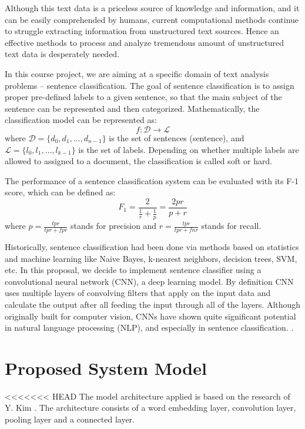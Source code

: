 \documentclass[conference]{IEEEtran}
\begin{document}
    Although this text data is a priceless source of knowledge and information,
    and it can be easily comprehended by humans, current computational methods
    continue to struggle extracting information from unstructured text sources\cite{mitchell2015}.
    Hence an effective methods to process and analyze tremendous
    amount of unstructured text data is desperately needed.
    
    In this course project, we are aiming at a specific domain of text analysis
    problems -- sentence classification. The goal of sentence classification is to assign
    proper pre-defined labels to a given sentence, so that the main subject of the 
    sentence can be represented and then categorized\cite{allahyari2017brief}. 
    Mathematically, the classification model can be represented as:
    $$f:\mathcal{D}\rightarrow\mathcal{L}$$
    where $\mathcal{D}=\{d_0, d_1,\ldots, d_{n-1}\}$ is the set of sentences
    (sentence), and $\mathcal{L}=\{l_0, l_1,\ldots, l_{k-1}\}$ is the set of labels.
    Depending on whether multiple labels are allowed to assigned to a document, the 
    classification is called soft or hard\cite{gopal2010multilabel}.
    
    The performance of a sentence classification system can be evaluated with its
    F-1 score, which can be defined as\cite{forman2003extensive}:
    $$F_1=\frac{2}{\frac{1}{r}+\frac{1}{p}}=\frac{2pr}{p+r}$$
    where $p=\frac{tpr}{tpr+fpr}$ stands for precision and $r=\frac{tpr}{tpr+fnr}$ 
    stands for recall.
    
    Historically, sentence classification had been done via methods based on 
    statistics and machine learning like Naive Bayes, k-nearest neighbors, decision 
    trees, SVM, etc. In this proposal, we decide to implement sentence classifier
    using a convolutional neural network (CNN), a deep learning model. By definition
    CNN uses multiple layers of convolving filters that apply on the input data and 
    calculate the output after all feeding the input through all of the layers. Although
    originally built for computer vision, CNNs have shown quite significant potential in 
    natural language processing (NLP), and especially in sentence classification.
    \cite{kim2014convolutional}. 

\section{Proposed System Model}
<<<<<<< HEAD
The model architecture applied is based on the research of Y. Kim \cite{kim2014convolutional}. The architecture 
consists of a word embedding layer, convolution layer, pooling layer and a connected
layer. 
\end{document}
